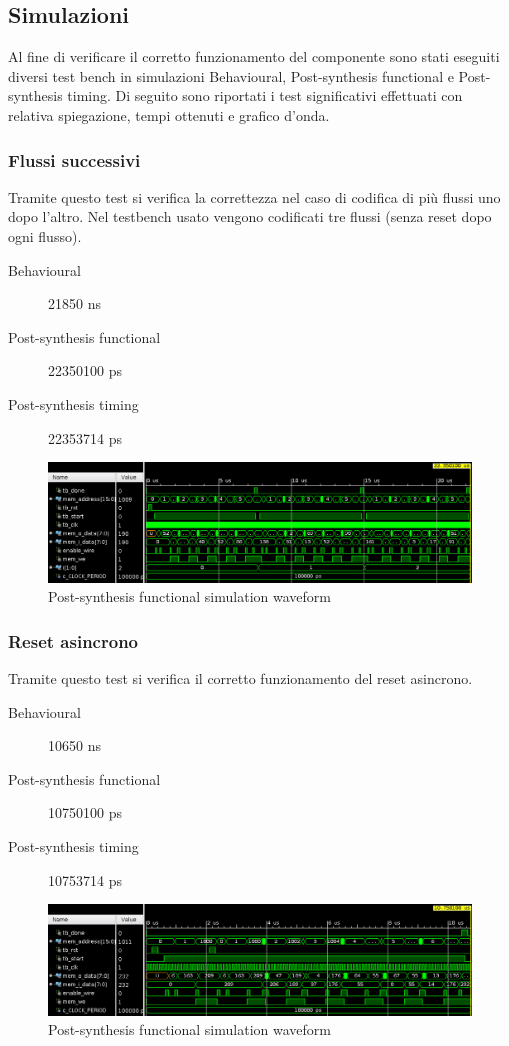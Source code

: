 \documentclass{article}
\begin{document}
\subsection{Simulazioni}
Al fine di verificare il corretto funzionamento del componente sono stati eseguiti diversi test bench in simulazioni Behavioural, Post-synthesis functional e Post-synthesis timing. 
Di seguito sono riportati i test significativi effettuati con relativa spiegazione, tempi ottenuti e grafico d'onda.

\subsubsection{Flussi successivi}
Tramite questo test si verifica la correttezza  nel caso di codifica di più flussi uno dopo l'altro. Nel testbench usato vengono codificati tre flussi (senza reset dopo ogni flusso).
\begin{description}
	\item[Behavioural] 21850 ns
	\item[Post-synthesis functional] 22350100 ps
	\item[Post-synthesis timing] 22353714 ps
\end{description}
\begin{figure}[H]
	\centering
	\includegraphics[width=1\textwidth]{Assets/tb1.png}
	\caption{Post-synthesis functional simulation waveform}
\end{figure}

\subsubsection{Reset asincrono}
Tramite questo test si verifica il corretto funzionamento del reset asincrono.
\begin{description}
	\item[Behavioural] 10650 ns
	\item[Post-synthesis functional] 10750100 ps
	\item[Post-synthesis timing] 10753714 ps
\end{description}
\begin{figure}[!htb]
	\centering
	\includegraphics[width=1\textwidth]{Assets/tb2.png}
	\caption{Post-synthesis functional simulation waveform}
\end{figure}
\end{document}
